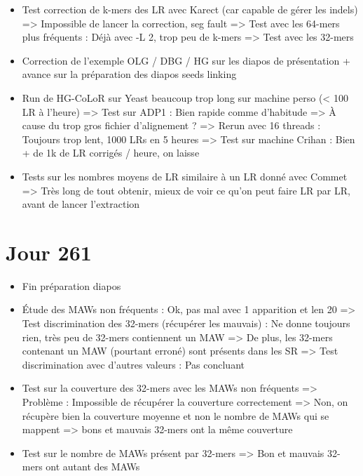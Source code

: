 \documentclass[12pt]{report}
\begin{document}
\begin{itemize}
	\item Test correction de k-mers des LR avec Karect (car capable de gérer les indels)
		  => Impossible de lancer la correction, seg fault
		  => Test avec les 64-mers plus fréquents : Déjà avec -L 2, trop peu de k-mers
		  => Test avec les 32-mers
		  
	\item Correction de l'exemple OLG / DBG / HG sur les diapos de présentation
		  + avance sur la préparation des diapos seeds linking
		  
	\item Run de HG-CoLoR sur Yeast beaucoup trop long sur machine perso (< 100 LR à l'heure)
		  => Test sur ADP1 : Bien rapide comme d'habitude
		  => À cause du trop gros fichier d'alignement ?
		  => Rerun avec 16 threads : Toujours trop lent, 1000 LRs en 5 heures
		  => Test sur machine Crihan : Bien + de 1k de LR corrigés / heure, on laisse
		  
	\item Tests sur les nombres moyens de LR similaire à un LR donné avec Commet
		  => Très long de tout obtenir, mieux de voir ce qu'on peut faire LR par LR,
		  	 avant de lancer l'extraction
\end{itemize}

\section{Jour 261}

\begin{itemize}
	\item Fin préparation diapos
	
	\item Étude des MAWs non fréquents : Ok, pas mal avec 1 apparition et len 20
		  => Test discrimination des 32-mers (récupérer les mauvais) : Ne donne toujours rien, très peu de 32-mers contiennent un MAW
		  	 => De plus, les 32-mers contenant un MAW (pourtant erroné) sont présents dans les SR
		  => Test discrimination avec d'autres valeurs : Pas concluant
		  
	\item Test sur la couverture des 32-mers avec les MAWs non fréquents => Problème : Impossible de récupérer la couverture correctement
		  	=> Non, on récupère bien la couverture moyenne et non le nombre de MAWs qui se mappent
		  => bons et mauvais 32-mers ont la même couverture
		  
	\item Test sur le nombre de MAWs présent par 32-mers => Bon et mauvais 32-mers ont autant des MAWs
\end{itemize}
\end{document}
